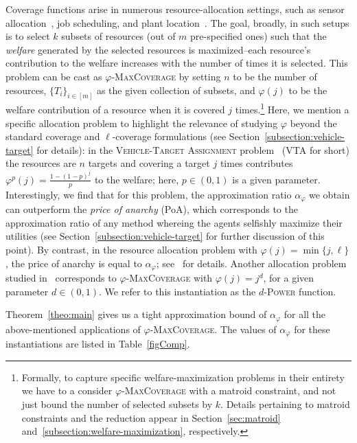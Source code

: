 Coverage functions arise in numerous resource-allocation settings, such as sensor allocation~\cite{MW08}, job scheduling, and plant location~\cite{CFN77}. The goal, broadly, in such setups is to select $k$ subsets of resources (out of $m$ pre-specified ones) such that the \emph{welfare} generated by the selected resources is maximized--each resource's contribution to the welfare increases with the number of times it is selected. This problem can be cast as $\varphi$-\textsc{MaxCoverage} by setting $n$ to be the number of resources, $\{T_i\}_{i\in [m]}$ as the given collection of subsets, and $\varphi(j)$ to be the welfare contribution of a resource when it is covered $j$ times.\footnote{Formally, to capture specific welfare-maximization problems in their entirety we have to a consider $\varphi$-\textsc{MaxCoverage} with a matroid constraint, and not just bound the number of selected subsets by $k$. Details pertaining to matroid constraints and the reduction appear in Section~\ref{sec:matroid} and~\ref{subsection:welfare-maximization}, respectively.}  Here, we mention a specific allocation problem to highlight the relevance of studying $\varphi$ beyond the standard coverage and $\ell$-coverage formulations (see Section~\ref{subsection:vehicle-target} for details): in the \textsc{Vehicle-Target Assignment} problem~\cite{Murphey00,PM19} (\textsc{VTA} for short) the resources are $n$ targets and covering a target $j$ times contributes $\varphi^p(j) = \frac{1-(1-p)^j}{p}$ to the welfare; here, $p \in (0,1)$ is a given parameter. Interestingly, we find that for this problem, the approximation ratio $\alpha_{\varphi}$ we obtain can outperform the \emph{price of anarchy} (PoA), which corresponds to the approximation ratio of any method whereing the agents selfishly maximize their utilities (see Section~\ref{subsection:vehicle-target} for further discussion of this point). By contrast, in the resource allocation problem with $\varphi(j) = \min\{j, \ell\}$, the price of anarchy is equal to $\alpha_{\varphi}$; see~\cite{CPM19} for details. Another allocation problem studied in~\cite{PM19} corresponds to $\varphi$-\textsc{MaxCoverage} with $\varphi(j) = j^d$, for a given parameter $d \in (0,1)$. We refer to this instantiation as the $d$-\textsc{Power} function. 

Theorem~\ref{theo:main} gives us a tight approximation bound of $\alpha_{\varphi}$ for all the above-mentioned applications of $\varphi$-\textsc{MaxCoverage}. The values of $\alpha_{\varphi}$ for these instantiations are listed in Table~\ref{figComp}. 

